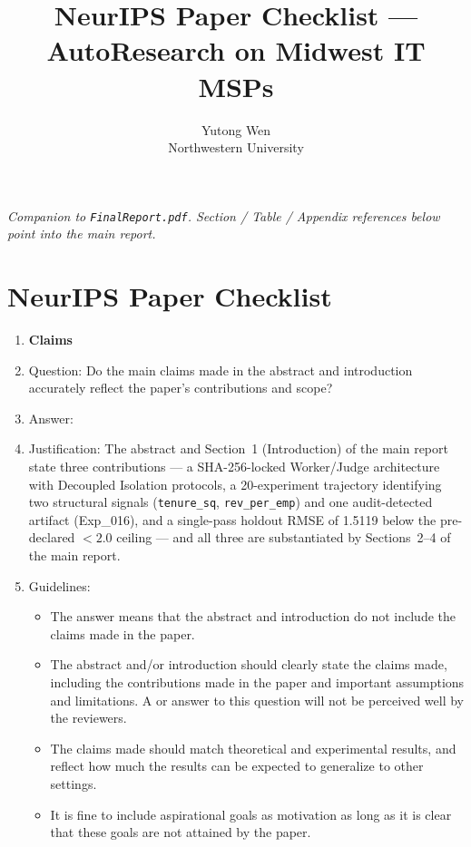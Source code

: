 \documentclass{article}
\title{NeurIPS Paper Checklist --- AutoResearch on Midwest IT MSPs}
\author{Yutong Wen \\ Northwestern University}
\date{}
\begin{document}
\maketitle
\vspace{-1.5em}

\noindent\textit{Companion to \texttt{FinalReport.pdf}. Section / Table / Appendix
references below point into the main report.}

\section*{NeurIPS Paper Checklist}

\begin{enumerate}

\item {\bf Claims}
    \item[] Question: Do the main claims made in the abstract and introduction accurately reflect the paper's contributions and scope?
    \item[] Answer: \answerYes{}
    \item[] Justification: The abstract and Section~1 (Introduction) of the main report state three contributions --- a SHA-256-locked Worker/Judge architecture with Decoupled Isolation protocols, a 20-experiment trajectory identifying two structural signals (\texttt{tenure\_sq}, \texttt{rev\_per\_emp}) and one audit-detected artifact (Exp\_016), and a single-pass holdout RMSE of 1.5119 below the pre-declared $<2.0$ ceiling --- and all three are substantiated by Sections~2--4 of the main report.
    \item[] Guidelines:
    \begin{itemize}
        \item The answer \answerNA{} means that the abstract and introduction do not include the claims made in the paper.
        \item The abstract and/or introduction should clearly state the claims made, including the contributions made in the paper and important assumptions and limitations. A \answerNo{} or \answerNA{} answer to this question will not be perceived well by the reviewers.
        \item The claims made should match theoretical and experimental results, and reflect how much the results can be expected to generalize to other settings.
        \item It is fine to include aspirational goals as motivation as long as it is clear that these goals are not attained by the paper.
    \end{itemize}


\end{enumerate}
\end{document}
